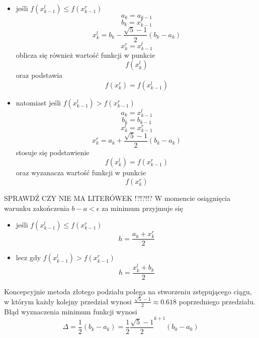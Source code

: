 \begin{itemize}
\item jeśli $f(x^l_{k-1}) \leq f(x^r_{k-1}) $ \newline
	\begin{equation}
	a_k = a_{k-1}
	\end{equation}
	\begin{equation}
	b_k = x^r_{k-1}
	\end{equation}
	\begin{equation}
	x^l_k = b_k - \frac{\sqrt{5} - 1}{2}(b_k - a_k)
	\end{equation}
	\begin{equation}
	x^r_k = x^l_{k-1}
	\end{equation}
	oblicza się również wartość funkcji w punkcie 
	\begin{equation}
	f(x^l_k)
	\end{equation}
	oraz podstawia
	\begin{equation}
	f(x^r_k) = f(x^l_{k-1})
	\end{equation}
\item natomiast jeśli $f(x^l_{k-1}) > f(x^r_{k-1}) $ \newline
	\begin{equation}
	a_k = x^l_{k-1}
	\end{equation}
	\begin{equation}
	b_k = b_{k-1}
	\end{equation}
	\begin{equation}
	x^l_k = x^r_{k-1}
	\end{equation}
	\begin{equation}
	x^r_k = a_k + \frac{\sqrt{5} - 1}{2}(b_k - a_k)
	\end{equation}
	stosuje się podstawienie 
	\begin{equation}
	f(x^l_k) = f(x^r_{k-1})
	\end{equation}
	oraz wyzanacza wartość funkcji w punkcie
	\begin{equation}
	f(x^r_k)
	\end{equation}
\end{itemize}
SPRAWDŹ CZY NIE MA LITERÓWEK !?!?!!?
W momencie osiągnięcia warunku zakończenia $b-a< \epsilon$ za minimum przyjmuje się
\begin{itemize}
\item jeśli $f(x^l_{k-1}) \leq f(x^r_{k-1}) $
	\begin{equation}
	h = \frac{a_k+x^r_k}{2}
	\end{equation}
\item lecz gdy $f(x^l_{k-1}) > f(x^r_{k-1}) $
	\begin{equation}
	h = \frac{x^l_k + b_k}{2}
	\end{equation}
\end{itemize}
Koncepcyjnie metoda złotego podziału polega na stworzeniu zstępującego ciągu, w którym każdy kolejny przedział wynosi $\frac{\sqrt{5} - 1}{2} \approx 0.618$ poprzedniego przedziału. Błąd wyznaczenia minimum funkcji wynosi
\begin{equation}
\Delta = \frac{1}{2}(b_k - a_k) = \frac{1}{2} {\frac{\sqrt{5} - 1}{2}}^{k+1}(b_0-a_0)
\end{equation}

